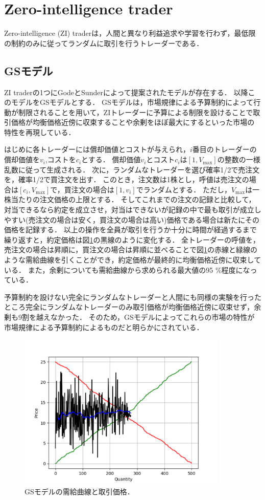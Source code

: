 \documentclass[titlepage]{jsreport}
\begin{document}
\section{Zero-intelligence trader}
Zero-intelligence (ZI) traderは，人間と異なり利益追求や学習を行わず，最低限の制約のみに従ってランダムに取引を行うトレーダーである．\cite{Gode_and_Sunder}

\subsection{GSモデル}
ZI traderの1つにGodeとSunderによって提案されたモデルが存在する\cite{Gode_and_Sunder}．
以降このモデルをGSモデルとする．
GSモデルは，市場規律による予算制約によって行動が制限されること\cite{market_displine}を用いて，ZIトレーダーに予算による制限を設けることで取引価格が均衡価格近傍に収束することや余剰をほぼ最大にするといった市場の特性を再現している．

はじめに各トレーダーには償却価値とコストが与えられ，$i$番目のトレーダーの償却価値を$v_i$,コストを$c_i$とする．
償却価値$v_i$とコスト$c_i$は$[1, V_\mathrm{max}]$の整数の一様乱数に従って生成される．
次に，ランダムなトレーダーを選び確率1/2で売注文を，確率1/2で買注文を出す．
このとき，注文数は1株とし，呼値は売注文の場合は$[c_i, V_\mathrm{max}]$で，買注文の場合は$[1, v_i]$でランダムとする．
ただし，$V_\mathrm{max}$は一株当たりの注文価格の上限とする．
そしてこれまでの注文の記録と比較して，対当できるなら約定を成立させ，対当はできないが記録の中で最も取引が成立しやすい(売注文の場合は安く，買注文の場合は高い)価格である場合は新たにその価格を記録する．
以上の操作を全員が取引を行うか十分に時間が経過するまで繰り返すと，約定価格は図\ref{fig:gode_sunder_trade}の黒線のように変化する．
全トレーダーの呼値を，売注文の場合は昇順に，買注文の場合は昇順に並べることで図\ref{fig:gode_sunder_trade}の赤線と緑線のような需給曲線を引くことができ，約定価格が最終的に均衡価格近傍に収束している．
また，余剰についても需給曲線から求められる最大値の95 \%程度になっている．

予算制約を設けない完全にランダムなトレーダーと人間にも同様の実験を行ったところ完全にランダムなトレーダーのみ取引価格が均衡価格近傍に収束せず，余剰も9割を越えなかった．
そのため，GSモデルによってこれらの市場の特性が市場規律による予算制約によるものだと明らかにされている．
\begin{figure}[htbp]
    \centering
    \includegraphics[width=10cm]{fig/gode_sunder_trade.pdf}
    \caption{GSモデルの需給曲線と取引価格．}
    \label{fig:gode_sunder_trade}
\end{figure}
\end{document}

